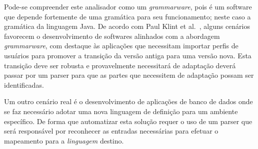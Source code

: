 Pode-se compreender este analisador como um \emph{grammarware}, pois é um software 
que depende fortemente de uma gramática para seu funcionamento; neste caso a gramática da linguagem Java. 
De acordo com Paul Klint et al.~\cite{klint2005toward}, alguns cenários favorecem o desenvolvimento de softwares alinhados com a abordagem 
\emph{grammarware}, com destaque às aplicações que necessitam importar perfis de usuários para promover a transição da versão 
antiga para uma versão nova. 
Esta transição deve ser robusta e provavelmente necessitará de adaptação deverá passar 
por um parser para que as partes que necessitem de adaptação possam ser identificadas.

Um outro cenário real é o desenvolvimento de aplicações de banco de dados onde se faz necessário adotar 
uma nova linguagem de definição para um ambiente específico. De forma que automatizar esta solução requer o uso de um 
parser que será responsável por reconhecer as entradas necessárias para efetuar o mapeamento 
para a \emph{linguagem} destino.







